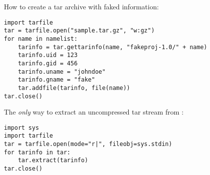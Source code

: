 How to create a tar archive with faked information:
\begin{verbatim}
import tarfile
tar = tarfile.open("sample.tar.gz", "w:gz")
for name in namelist:
    tarinfo = tar.gettarinfo(name, "fakeproj-1.0/" + name)
    tarinfo.uid = 123
    tarinfo.gid = 456
    tarinfo.uname = "johndoe"
    tarinfo.gname = "fake"
    tar.addfile(tarinfo, file(name))
tar.close()
\end{verbatim}

The \emph{only} way to extract an uncompressed tar stream from
:
\begin{verbatim}
import sys
import tarfile
tar = tarfile.open(mode="r|", fileobj=sys.stdin)
for tarinfo in tar:
    tar.extract(tarinfo)
tar.close()
\end{verbatim}

